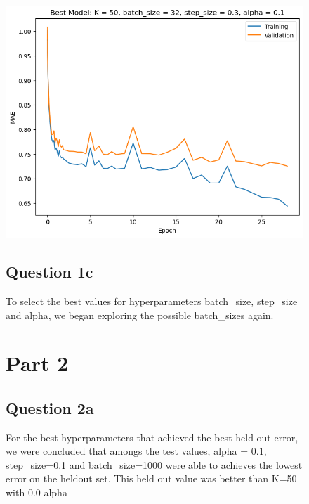 \documentclass[a4paper]{article}
\begin{document}
\begin{figure}[h]
	\includegraphics[width=\textwidth]{../images/Figure1b.png}
	\caption{For the best hyperparameters that achieved the best held out error,
  we were concluded that amongs the test values, alpha = 0.1, step\_size=0.1 and
batch\_size=1000 were able to achieves the lowest error on the heldout set. This
held out value was better than K=50 with 0.0 alpha }
\subsection{Question 1c}
To select the best values for hyperparameters batch\_size, step\_size and alpha,
we began exploring the possible batch\_sizes again.

\section{Part 2}
\subsection{Question 2a}

\end{figure}
\end{document}
